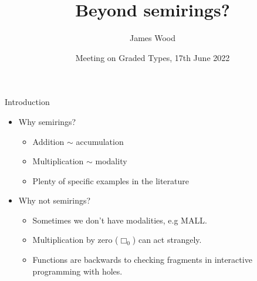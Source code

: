 \documentclass[fleqn]{beamer}
\title{Beyond semirings?}
\author{James Wood}
\institute{University of Strathclyde \and Huawei Technologies R\&D UK}
\date{Meeting on Graded Types, 17th June 2022}
\begin{document}
\frame{\titlepage}

\begin{frame}{Introduction}
  \begin{itemize}
    \item Why semirings?
      \begin{itemize}
        \item Addition $\sim$ accumulation
        \item Multiplication $\sim$ modality
        \item Plenty of specific examples in the literature
      \end{itemize}
      \pause
    \item Why not semirings?
      \begin{itemize}
        \item Sometimes we don't have modalities, e.g MALL.
        \item Multiplication by zero ($\Box_0$) can act strangely.
        \item Functions are backwards to checking fragments in interactive
          programming with holes.
      \end{itemize}
  \end{itemize}
\end{frame}
\end{document}
